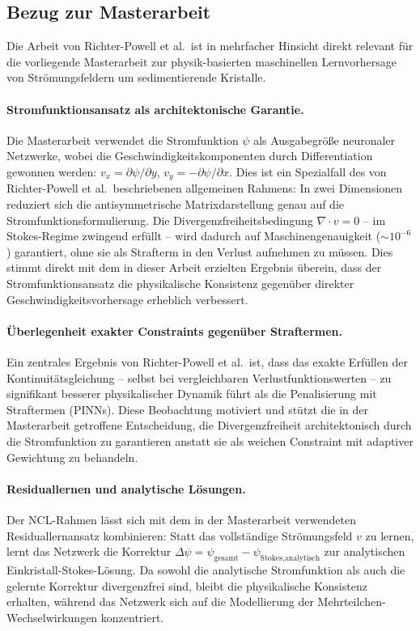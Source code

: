 \documentclass[a4paper,12pt]{article}
\begin{document}
\subsection*{Bezug zur Masterarbeit}

Die Arbeit von Richter-Powell et al.\ ist in mehrfacher Hinsicht direkt relevant f\"ur die vorliegende
Masterarbeit zur physik-basierten maschinellen Lernvorhersage von Str\"omungsfeldern um
sedimentierende Kristalle.

\paragraph{Stromfunktionsansatz als architektonische Garantie.}
Die Masterarbeit verwendet die Stromfunktion $\psi$ als Ausgabegr\"o{\ss}e neuronaler Netzwerke,
wobei die Geschwindigkeitskomponenten durch Differentiation gewonnen werden:
$v_x = \partial\psi/\partial y$, $v_y = -\partial\psi/\partial x$. Dies ist ein Spezialfall des
von Richter-Powell et al.\ beschriebenen allgemeinen Rahmens: In zwei Dimensionen reduziert sich
die antisymmetrische Matrixdarstellung genau auf die Stromfunktionsformulierung. Die
Divergenzfreiheitsbedingung $\nabla \cdot v = 0$ -- im Stokes-Regime zwingend erf\"ullt -- wird
dadurch auf Maschinengenauigkeit ($\sim 10^{-6}$) garantiert, ohne sie als Strafterm in den
Verlust aufnehmen zu m\"ussen. Dies stimmt direkt mit dem in dieser Arbeit erzielten Ergebnis
\"uberein, dass der Stromfunktionsansatz die physikalische Konsistenz gegen\"uber direkter
Geschwindigkeitsvorhersage erheblich verbessert.

\paragraph{\"Uberlegenheit exakter Constraints gegen\"uber Straftermen.}
Ein zentrales Ergebnis von Richter-Powell et al.\ ist, dass das exakte Erf\"ullen der
Kontinuit\"atsgleichung -- selbst bei vergleichbaren Verlustfunktionswerten -- zu signifikant
besserer physikalischer Dynamik f\"uhrt als die Penalisierung mit Straftermen (PINNs). Diese
Beobachtung motiviert und st\"utzt die in der Masterarbeit getroffene Entscheidung, die
Divergenzfreiheit architektonisch durch die Stromfunktion zu garantieren anstatt sie als
weichen Constraint mit adaptiver Gewichtung zu behandeln.

\paragraph{Residuallernen und analytische L\"osungen.}
Der NCL-Rahmen l\"asst sich mit dem in der Masterarbeit verwendeten Residuallernansatz
kombinieren: Statt das vollst\"andige Str\"omungsfeld $v$ zu lernen, lernt das Netzwerk die
Korrektur $\Delta\psi = \psi_{\text{gesamt}} - \psi_{\text{Stokes,analytisch}}$ zur analytischen
Einkristall-Stokes-L\"osung. Da sowohl die analytische Stromfunktion als auch die gelernte
Korrektur divergenzfrei sind, bleibt die physikalische Konsistenz erhalten, w\"ahrend das
Netzwerk sich auf die Modellierung der Mehrteilchen-Wechselwirkungen konzentriert.
\end{document}
